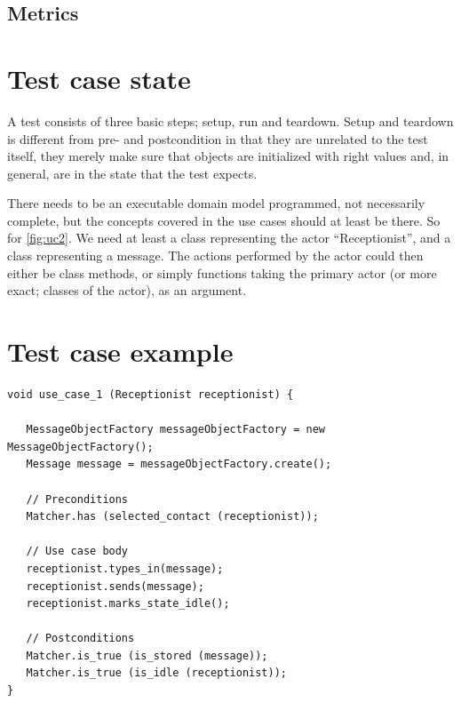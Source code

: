 \subsection{Metrics}

\section{Test case state}
A test consists of three basic steps; setup, run and teardown. Setup and teardown is different from pre- and postcondition in that they are unrelated to the test itself, they merely make sure that objects are initialized with right values and, in general, are in the state that the test expects.

There needs to be an executable domain model programmed, not necessarily complete, but the concepts covered in the use cases should at least be there. So for \ref{fig:uc2}. We need at least a class representing the actor ``Receptionist'', and a class representing a message. The actions performed by the actor could then either be class methods, or simply functions taking the primary actor (or more exact; classes of the actor), as an argument.

\label{sec:test_case_state}

\section{Test case example}
\begin{lstlisting}
void use_case_1 (Receptionist receptionist) {

   MessageObjectFactory messageObjectFactory = new MessageObjectFactory();
   Message message = messageObjectFactory.create();

   // Preconditions
   Matcher.has (selected_contact (receptionist));

   // Use case body 
   receptionist.types_in(message);
   receptionist.sends(message);
   receptionist.marks_state_idle();

   // Postconditions 
   Matcher.is_true (is_stored (message));
   Matcher.is_true (is_idle (receptionist));
}
\end{lstlisting}

